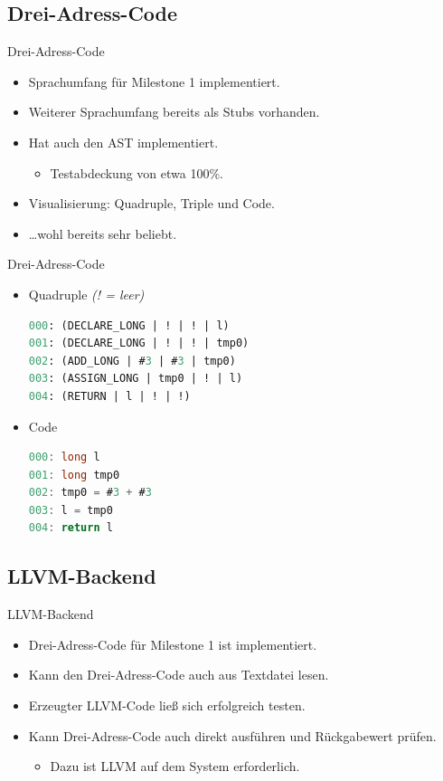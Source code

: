 \documentclass[ucs,10pt]{beamer}
\newlength{\wideitemsep}
\let\olditem\item
\renewcommand{\item}{\setlength{\itemsep}{\wideitemsep}\olditem}
\begin{document}
\subsection{Drei-Adress-Code}
\begin{frame}{Drei-Adress-Code}
	\begin{itemize}
		\item Sprachumfang für Milestone 1 implementiert.
		\item Weiterer Sprachumfang bereits als Stubs vorhanden.
		\item Hat auch den AST implementiert.
		\begin{itemize}
			\item Testabdeckung von etwa 100\%.
		\end{itemize}
		\item Visualisierung: Quadruple, Triple und Code.
		\item \dots wohl bereits sehr beliebt.
	\end{itemize}
\end{frame}

\begin{frame}[fragile]{Drei-Adress-Code}
	\begin{itemize}
		\item Quadruple \emph{(! = leer)}
			\begin{lstlisting}[language=Lisp]
000: (DECLARE_LONG | ! | ! | l)
001: (DECLARE_LONG | ! | ! | tmp0)
002: (ADD_LONG | #3 | #3 | tmp0)
003: (ASSIGN_LONG | tmp0 | ! | l)
004: (RETURN | l | ! | !)
     		\end{lstlisting}
     
     	\item Code
     		\begin{lstlisting}[language=C]
000: long l
001: long tmp0
002: tmp0 = #3 + #3
003: l = tmp0
004: return l
     	\end{lstlisting}
	\end{itemize}
\end{frame}

\subsection{LLVM-Backend}
\begin{frame}{LLVM-Backend}
	\begin{itemize}
		\item Drei-Adress-Code für Milestone 1 ist implementiert.
		\item Kann den Drei-Adress-Code auch aus Textdatei lesen.
		\item Erzeugter LLVM-Code ließ sich erfolgreich testen.
		\item Kann Drei-Adress-Code auch direkt ausführen und Rückgabewert prüfen.
		\begin{itemize}
			\item Dazu ist LLVM auf dem System erforderlich.
		\end{itemize}
	\end{itemize}
\end{frame}
\end{document}
